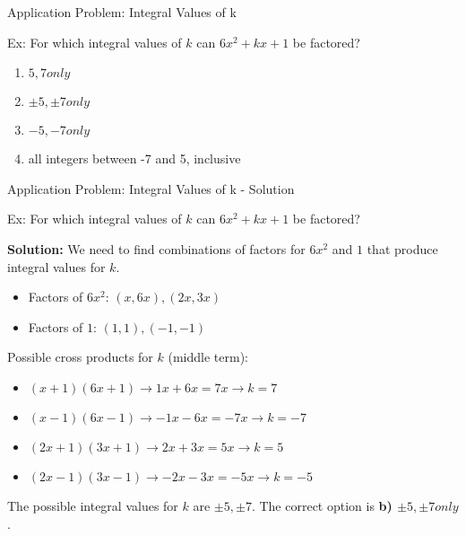 \documentclass[aspectratio=169]{beamer}
\begin{document}
\begin{frame}{Application Problem: Integral Values of k}
    \begin{tcolorbox}[colback=lightgray,colframe=primary,title=Integral Values of k]
        \footnotesize
        Ex: For which integral values of $k$ can $6x^2 + kx + 1$ be factored?
        \begin{enumerate}
            \item $5, 7 only$
            \item $\pm5, \pm7 only$
            \item $-5, -7 only$
            \item all integers between -7 and 5, inclusive
        \end{enumerate}
    \end{tcolorbox}
\end{frame}

\begin{frame}{Application Problem: Integral Values of k - Solution}
    \begin{tcolorbox}[colback=lightgray,colframe=accent,title=Detailed Solution]
        \footnotesize
        Ex: For which integral values of $k$ can $6x^2 + kx + 1$ be factored?
        
        \textbf{Solution:}
        We need to find combinations of factors for $6x^2$ and $1$ that produce integral values for $k$.
        \begin{itemize}
            \item Factors of $6x^2$: $(x, 6x), (2x, 3x)$
            \item Factors of $1$: $(1, 1), (-1, -1)$
        \end{itemize}
        
        Possible cross products for $k$ (middle term):
        \begin{itemize}
            \item $(x + 1)(6x + 1) \rightarrow 1x + 6x = 7x \rightarrow k = 7$
            \item $(x - 1)(6x - 1) \rightarrow -1x - 6x = -7x \rightarrow k = -7$
            \item $(2x + 1)(3x + 1) \rightarrow 2x + 3x = 5x \rightarrow k = 5$
            \item $(2x - 1)(3x - 1) \rightarrow -2x - 3x = -5x \rightarrow k = -5$
        \end{itemize}
        The possible integral values for $k$ are $\pm5, \pm7$.
        The correct option is \textbf{b) $\pm5, \pm7 only$}.
    \end{tcolorbox}
\end{frame}
\end{document}
